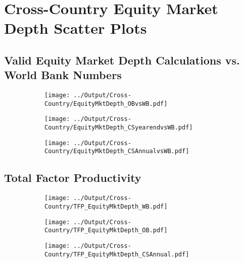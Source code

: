 \documentclass[12pt,notitlepage]{article}
\begin{document}

\FloatBarrier
\section{Cross-Country Equity Market Depth Scatter Plots} %
\label{sec:ccemd}
\FloatBarrier


\subsection{Valid Equity Market Depth Calculations vs. World Bank Numbers}
\begin{figure}[!htpb]
\centering
\begin{subfigure}{.49\textwidth}
    \centering
  \texttt{[image: ../Output/Cross-Country/EquityMktDepth\_OBvsWB.pdf]}
\end{subfigure}
\begin{subfigure}{.49\textwidth}
    \centering
 \texttt{[image: ../Output/Cross-Country/EquityMktDepth\_CSyearendvsWB.pdf]}
\end{subfigure}%
\begin{subfigure}{.49\textwidth}
    \centering
  \texttt{[image: ../Output/Cross-Country/EquityMktDepth\_CSAnnualvsWB.pdf]}
\end{subfigure}
\end{figure}
\pagebreak


\subsection{Total Factor Productivity}
\begin{figure}[!htpb]
\centering
\begin{subfigure}{.49\textwidth}
    \centering
 \texttt{[image: ../Output/Cross-Country/TFP\_EquityMktDepth\_WB.pdf]}
\end{subfigure}
\begin{subfigure}{.49\textwidth}
    \centering
  \texttt{[image: ../Output/Cross-Country/TFP\_EquityMktDepth\_OB.pdf]}
\end{subfigure}
\begin{subfigure}{.49\textwidth}
    \centering
  \texttt{[image: ../Output/Cross-Country/TFP\_EquityMktDepth\_CSAnnual.pdf]}
\end{subfigure}
\end{figure}
\pagebreak
\end{document}
